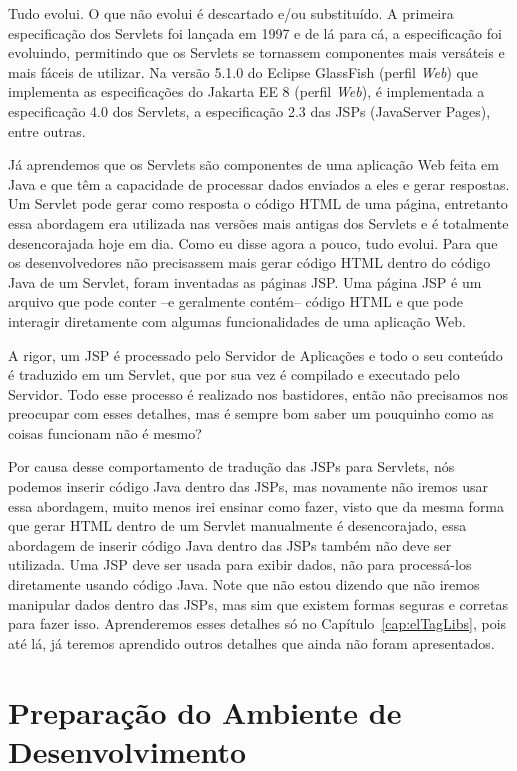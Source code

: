 Tudo evolui. O que não evolui é descartado e/ou substituído. A primeira especificação dos Servlets foi lançada em 1997 e de lá para cá, a especificação foi evoluindo, permitindo que os Servlets se tornassem componentes mais versáteis e mais fáceis de utilizar. Na versão 5.1.0 do Eclipse GlassFish (perfil \textit{Web}) que implementa as especificações do Jakarta EE 8 (perfil \textit{Web}), é implementada a especificação 4.0 dos Servlets, a especificação 2.3 das JSPs (JavaServer Pages), entre outras.

Já aprendemos que os Servlets são componentes de uma aplicação Web feita em Java e que têm a capacidade de processar dados enviados a eles e gerar respostas. Um Servlet pode gerar como resposta o código HTML de uma página, entretanto essa abordagem era utilizada nas versões mais antigas dos Servlets e é totalmente desencorajada hoje em dia. Como eu disse agora a pouco, tudo evolui. Para que os desenvolvedores não precisassem mais gerar código HTML dentro do código Java de um Servlet, foram inventadas as páginas JSP. Uma página JSP é um arquivo que pode conter –e geralmente contém– código HTML e que pode interagir diretamente com algumas funcionalidades de uma aplicação Web.

A rigor, um JSP é processado pelo Servidor de Aplicações e todo o seu conteúdo é traduzido em um Servlet, que por sua vez é compilado e executado pelo Servidor. Todo esse processo é realizado nos bastidores, então não precisamos nos preocupar com esses detalhes, mas é sempre bom saber um pouquinho como as coisas funcionam não é mesmo?

Por causa desse comportamento de tradução das JSPs para Servlets, nós podemos inserir código Java dentro das JSPs, mas novamente não iremos usar essa abordagem, muito menos irei ensinar como fazer, visto que da mesma forma que gerar HTML dentro de um Servlet manualmente é desencorajado, essa abordagem de inserir código Java dentro das JSPs também não deve ser utilizada. Uma JSP deve ser usada para exibir dados, não para processá-los diretamente usando código Java. Note que não estou dizendo que não iremos manipular dados dentro das JSPs, mas sim que existem formas seguras e corretas para fazer isso. Aprenderemos esses detalhes só no Capítulo~\ref{cap:elTagLibs}, pois até lá, já teremos aprendido outros detalhes que ainda não foram apresentados.


\section{Preparação do Ambiente de Desenvolvimento}

